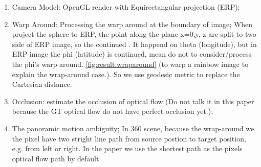 \begin{enumerate}
	\item Camera Model: OpenGL render with Equirectangular projection (ERP);
	\item Warp Around: Processing the warp around at the boundary of image; When project the sphere to ERP, the point along the plane x=0,y,-z are split to two side of ERP image, so the continued . It happend on theta (longitude), but in ERP image the phi (latitude) is continued, mean do not to consider/process the phi's warp around. \cref{fig:result:wraparound} (to warp a rainbow image to explain the wrap-around case.). So we use geodesic metric to replace the Cartesian distance.
	\item Occlusion: estimate the occlusion of optical flow (Do not talk it in this paper because the GT optical flow do not have perfect occlusion yet.);
	\item The panoramic motion ambiguity; In 360 scene, because the wrap-around we the pixel have two stright line path from source postion to target position, e.g. from left or right. In the paper we use the shortest path as the pixels optical flow path by default.
\end{enumerate}




%
